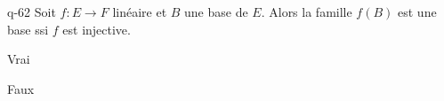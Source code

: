 \begin{truefalse}{q-62}
Soit $f : E \to F$ linéaire et $B$  une base de $E$. Alors la famille $f(B)$ est une base ssi $f$ est injective.
\item Vrai
\item* Faux
\end{truefalse}


